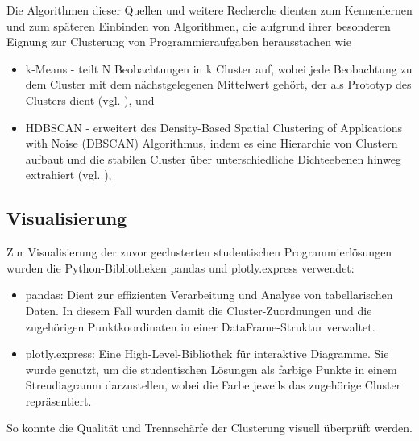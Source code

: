 Die Algorithmen dieser Quellen und weitere Recherche dienten zum Kennenlernen und zum späteren Einbinden von Algorithmen, die aufgrund ihrer besonderen Eignung zur Clusterung von Programmieraufgaben herausstachen wie 
\begin{itemize}
    \item k-Means - teilt N Beobachtungen in k Cluster auf, wobei jede Beobachtung zu dem Cluster mit dem nächstgelegenen Mittelwert gehört, der als Prototyp des Clusters dient (vgl. \cite{MacQueen.1967}), und
    \item HDBSCAN - erweitert des Density-Based Spatial Clustering of Applications with Noise (DBSCAN) Algorithmus, indem es eine Hierarchie von Clustern aufbaut und die stabilen Cluster über unterschiedliche Dichteebenen hinweg extrahiert (vgl. \cite{CampelloRicardoJ.G.B..}),
\end{itemize}

\subsection{Visualisierung}
Zur Visualisierung der zuvor geclusterten studentischen Programmierlösungen wurden die Python-Bibliotheken pandas und plotly.express verwendet:
\begin{itemize}
    \item pandas: Dient zur effizienten Verarbeitung und Analyse von tabellarischen Daten. In diesem Fall wurden damit die Cluster-Zuordnungen und die zugehörigen Punktkoordinaten in einer DataFrame-Struktur verwaltet.
    \item plotly.express: Eine High-Level-Bibliothek für interaktive Diagramme. Sie wurde genutzt, um die studentischen Lösungen als farbige Punkte in einem Streudiagramm darzustellen, wobei die Farbe jeweils das zugehörige Cluster repräsentiert.
\end{itemize}
So konnte die Qualität und Trennschärfe der Clusterung visuell überprüft werden.

